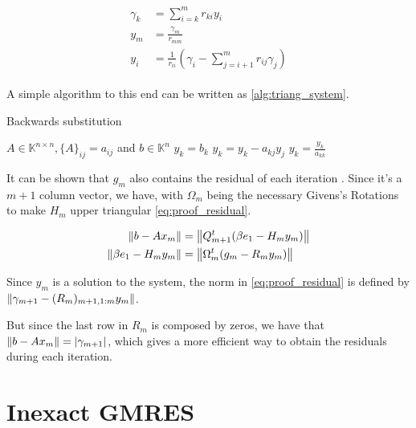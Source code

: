 \begin{align}\label{eq:triangular_system}
    \begin{split}
        \gamma_{k} &= \sum_{i=k}^{m} r_{ki} y_{i}\\
        y_{m} &= \frac{\gamma_{m}}{r_{mm}} \\
        y_{i} &= \frac{1}{r_{ii}} \left( \gamma_{i} - \sum_{j=i+1}^{m} r_{ij} \gamma_{j}  \right)
    \end{split}
\end{align}

A simple algorithm to this end can be written as \ref{alg:triang_system}.

\begin{algorithm}
    \caption{Backwards substitution}\label{alg:triang_system}
    \begin{algorithmic}[1]
        \State $A \in \mathbb{K}^{n \times n}, \{ A \}_{ij} = a_{ij}$ and $b\in \mathbb{K}^{n}$
        \State $y_{k} = b_{k}$
        \State $y_{k} = y_{k} - a_{kj}y_{j}$
        \EndFor
        \State $y_{k} = \frac{y_{k}}{a_{kk}}$
        \EndFor
    \end{algorithmic}
\end{algorithm}



It can be shown that $g_{m}$ also contains the residual of each iteration \cite{saad2003iterative}. Since it's a $m+1$ column vector, we have, with $\Omega_{m}$ being the necessary Givens's Rotations to make $H_{m}$ upper triangular \ref{eq:proof_residual}.

\begin{align}\label{eq:proof_residual}
    \begin{split}
        \left\lVert b - Ax_{m}\right\rVert & = \left\lVert Q_{m+1}^{t}(\beta e_{1} - H_{m}y_{m})\right\rVert\\
        \left\lVert\beta e_{1} - H_{m}y_{m}\right\rVert &= \left\lVert\Omega_{m}^{t} (g_{m} - R_{m}y_{m})\right\rVert
    \end{split}
\end{align}

Since $y_{m}$ is a solution to the system, the norm in \ref{eq:proof_residual} is defined by $\left\lVert\gamma_{m+1} - (R_{m})_{m+1,1:m} y_{m}\right\rVert$.

But since the last row in $R_{m}$ is composed by zeros, we have that $\left\lVert b - Ax_{m}\right\rVert = |\gamma_{m+1}|$, which gives a more efficient way to obtain the residuals during each iteration.


\section{Inexact GMRES}

